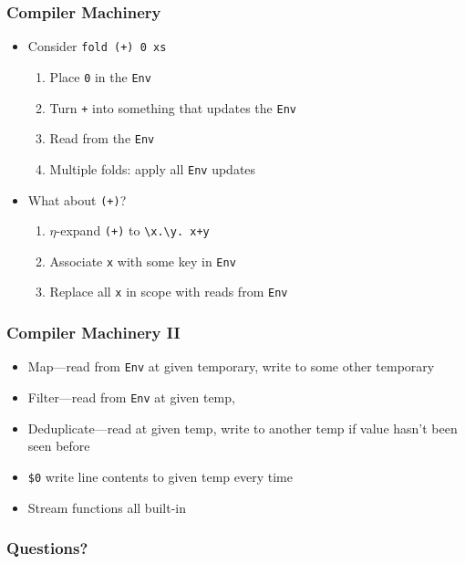 \documentclass{beamer}
\begin{document}
\begin{frame}[fragile]
  \frametitle{Compiler Machinery}
  \begin{itemize}
    \item Consider \verb|fold (+) 0 xs|
    \begin{enumerate}
      \item Place \verb|0| in the \verb|Env|
      \item Turn \verb|+| into something that updates the \verb|Env|
      \item Read from the \verb|Env|
      \item Multiple folds: apply all \verb|Env| updates
    \end{enumerate}
    \item What about \verb|(+)|?
    \begin{enumerate}
      \item $\eta$-expand \verb|(+)| to \verb|\x.\y. x+y|
      \item Associate \verb|x| with some key in \verb|Env|
      \item Replace all \verb|x| in scope with reads from \verb|Env| %
    \end{enumerate}
  \end{itemize}
\end{frame}

\begin{frame}[fragile]
  \frametitle{Compiler Machinery II}
  \begin{itemize}
    \item Map---read from \verb|Env| at given temporary, write to some other temporary
    \item Filter---read from \verb|Env| at given temp,
    \item Deduplicate---read at given temp, write to another temp if value hasn't been seen before
    \item \verb|$0| write line contents to given temp every time
    \item Stream functions all built-in
  \end{itemize}
\end{frame}


\begin{frame}
  \frametitle{Questions?}
\end{frame}
\end{document}
